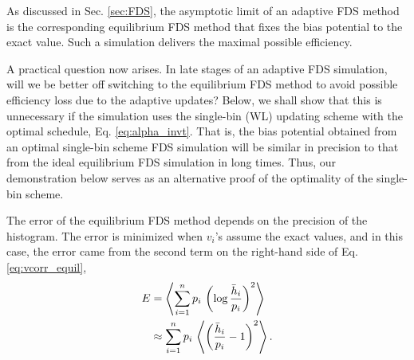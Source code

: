 \documentclass[reprint, floatfix]{revtex4-1}
\begin{document}
As discussed in Sec. \ref{sec:FDS},
the asymptotic limit of an adaptive FDS method
is the corresponding equilibrium FDS method
that fixes the bias potential to the exact value.
%
Such a simulation delivers the maximal possible efficiency.

A practical question now arises.
%
In late stages of an adaptive FDS simulation,
will we be better off switching to the equilibrium FDS method
to avoid possible efficiency loss due to the adaptive updates?
%
Below, we shall show that this is unnecessary
if the simulation uses the single-bin (WL) updating scheme
with the optimal schedule, Eq. \eqref{eq:alpha_invt}.
%
That is, the bias potential obtained from
an optimal single-bin scheme FDS simulation
will be similar in precision to that from
the ideal equilibrium FDS simulation
in long times.
%
Thus, our demonstration below serves as an alternative proof
of the optimality of the single-bin scheme.

The error of the equilibrium FDS method
depends on the precision of the histogram.
%
The error is minimized
when $v_i$'s assume the exact values,
%
and in this case,
the error came from the second term
on the right-hand side of Eq. \eqref{eq:vcorr_equil},
%
\begin{align}
E
&=
\left\langle
  \sum_{ i = 1 }^ n
    p_i \,
    \left(
      \log \frac { \bar h_i }
                 {      p_i }
    \right)^2
\right\rangle
\notag
\\
&\approx
\sum_{ i = 1 }^ n
  p_i \,
  \left\langle
    \left(
      \frac { \bar h_i }
            {      p_i }
      - 1
    \right)^2
  \right\rangle.
\end{align}
\end{document}
